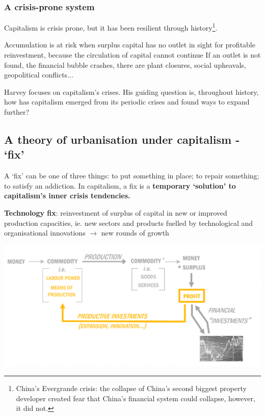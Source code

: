 \documentclass{article}
\begin{document}
\subsubsection{A crisis-prone system}

Capitalism is crisis prone, but it has been resilient through history\footnote{China's Evergrande crisis: the collapse of China's second biggest property developer created fear that China's financial system could collapse, however, it did not.}. 

\begin{outline}
	\1 Accumulation is at risk when surplus capital has no outlet in sight for profitable reinvestment, because the circulation of capital cannot continue
	\1 If an outlet is not found, the financial bubble crashes, there are plant closures, social upheavals, geopolitical conflicts...
\end{outline}


Harvey focuses on capitalism's crises. His guiding question is, throughout history, how has capitalism emerged from its periodic crises and found ways to expand further?

\subsection{A theory of urbanisation under capitalism - `fix'}

A `fix' can be one of three things: to put something in place; to repair something; to satisfy an addiction. In capitalism, a fix is a \textbf{temporary `solution' to capitalism's inner crisis tendencies.}

\textbf{Technology fix}: reinvestment of surplus of capital in new or improved production capacities, ie. new sectors and products fuelled by technological and organisational innovations $\rightarrow$ new rounds of growth

\includegraphics[width=\textwidth]{technological_fix}
\end{document}
